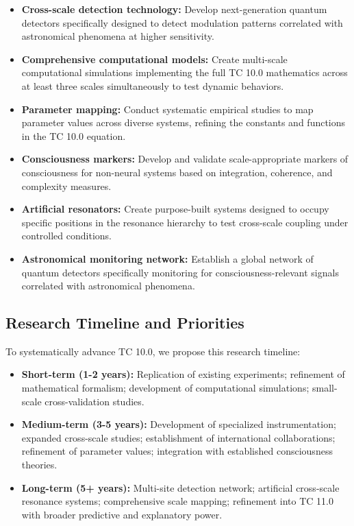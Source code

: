 \documentclass[12pt]{article}
\begin{document}
\begin{itemize}
    \item \textbf{Cross-scale detection technology:} Develop next-generation quantum detectors specifically designed to detect modulation patterns correlated with astronomical phenomena at higher sensitivity.
    
    \item \textbf{Comprehensive computational models:} Create multi-scale computational simulations implementing the full TC 10.0 mathematics across at least three scales simultaneously to test dynamic behaviors.
    
    \item \textbf{Parameter mapping:} Conduct systematic empirical studies to map parameter values across diverse systems, refining the constants and functions in the TC 10.0 equation.
    
    \item \textbf{Consciousness markers:} Develop and validate scale-appropriate markers of consciousness for non-neural systems based on integration, coherence, and complexity measures.
    
    \item \textbf{Artificial resonators:} Create purpose-built systems designed to occupy specific positions in the resonance hierarchy to test cross-scale coupling under controlled conditions.
    
    \item \textbf{Astronomical monitoring network:} Establish a global network of quantum detectors specifically monitoring for consciousness-relevant signals correlated with astronomical phenomena.
\end{itemize}

\subsection{Research Timeline and Priorities}

To systematically advance TC 10.0, we propose this research timeline:

\begin{itemize}
    \item \textbf{Short-term (1-2 years):} Replication of existing experiments; refinement of mathematical formalism; development of computational simulations; small-scale cross-validation studies.
    
    \item \textbf{Medium-term (3-5 years):} Development of specialized instrumentation; expanded cross-scale studies; establishment of international collaborations; refinement of parameter values; integration with established consciousness theories.
    
    \item \textbf{Long-term (5+ years):} Multi-site detection network; artificial cross-scale resonance systems; comprehensive scale mapping; refinement into TC 11.0 with broader predictive and explanatory power.
\end{itemize}
\end{document}
